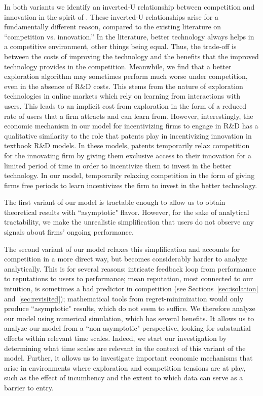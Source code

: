 {In both variants we identify an inverted-U relationship between competition and innovation in the spirit of . These inverted-U relationships arise for a fundamentally different reason, compared to the existing literature on ``competition vs. innovation.'' In the literature, better technology always helps in a competitive environment, other things being equal. Thus, the trade-off is between the costs of improving the technology and the benefits that the improved technology provides in the competition. Meanwhile, we find that a better exploration algorithm may sometimes perform much worse under competition, even in the absence of R\&D costs. This stems from the nature of exploration technologies in online markets which rely on learning from interactions with users. This leads to an implicit cost from exploration in the form of a reduced rate of users that a firm attracts and can learn from. However, interestingly, the economic mechanism in our model for incentivizing firms to engage in R\&D has a qualitative similarity to the role that patents play in incentivizing innovation in textbook R\&D models. In these models, patents temporarily relax competition for the innovating firm by giving them exclusive access to their innovation for a limited period of time in order to incentivize them to invest in the better technology. In our model, temporarily relaxing competition in the form of giving firms free periods to learn incentivizes the firm to invest in the better technology.

The first variant of our model is tractable enough to allow us to obtain theoretical results with ``asymptotic" flavor. However, for the sake of analytical tractability, we make the unrealistic simplification that users do not observe any signals about firms' ongoing performance.

The second variant of our model relaxes this simplification and accounts for competition in a more direct way, but becomes considerably harder to analyze analytically. This is for several reasons: intricate feedback loop from performance to reputations to users to performance;
%
mean reputation, most connected to our intuition, is sometimes a bad predictor in competition (see Sections~\ref{sec:isolation} and~\ref{sec:revisited});
%
mathematical tools from regret-minimization would only produce ``asymptotic" results, which do not seem to suffice. We therefore analyze our model using numerical simulation, which has several benefits. It allows us to analyze our model from a ``non-asymptotic" perspective, looking for substantial effects within relevant time scales. Indeed, we start our investigation by determining what time scales are relevant in the context of this variant of the model. Further, it allows us to investigate important economic mechanisms that arise in environments where exploration and competition tensions are at play, such as the effect of incumbency and the extent to which data can serve as a barrier to entry.

}
